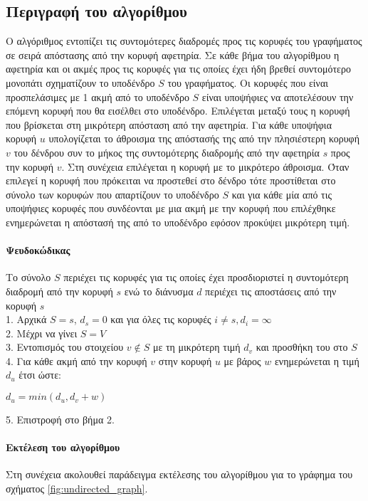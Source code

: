 \subsection{Περιγραφή του αλγορίθμου}
Ο αλγόριθμος εντοπίζει τις συντομότερες διαδρομές προς τις κορυφές του γραφήματος σε σειρά απόστασης από την κορυφή αφετηρία. Σε κάθε βήμα του αλγορίθμου η αφετηρία και οι ακμές προς τις κορυφές για τις οποίες έχει ήδη βρεθεί συντομότερο μονοπάτι σχηματίζουν το υποδένδρο $S$ του γραφήματος. Οι κορυφές που είναι προσπελάσιμες με 1 ακμή από το υποδένδρο $S$ είναι υποψήφιες να αποτελέσουν την επόμενη κορυφή που θα εισέλθει στο υποδένδρο. Επιλέγεται μεταξύ τους η κορυφή που βρίσκεται στη μικρότερη απόσταση από την αφετηρία. Για κάθε υποψήφια κορυφή $u$ υπολογίζεται το άθροισμα της απόστασής της από την πλησιέστερη κορυφή $v$ του δένδρου συν το μήκος της συντομότερης διαδρομής από την αφετηρία $s$ προς την κορυφή $v$. Στη συνέχεια επιλέγεται η κορυφή με το μικρότερο άθροισμα. Όταν επιλεγεί η κορυφή που πρόκειται να προστεθεί στο δένδρο τότε προστίθεται στο σύνολο των κορυφών που απαρτίζουν το υποδένδρο $S$  και για κάθε μία από τις υποψήφιες κορυφές που συνδέονται με μια ακμή με την κορυφή που επιλέχθηκε ενημερώνεται η απόστασή της από το υποδένδρο εφόσον προκύψει μικρότερη τιμή.

\paragraph{Ψευδοκώδικας}
Το σύνολο $S$ περιέχει τις κορυφές για τις οποίες έχει προσδιοριστεί η συντομότερη διαδρομή από την κορυφή $s$ ενώ το διάνυσμα $d$ περιέχει τις αποστάσεις από την κορυφή $s$ \\
1. Αρχικά $S={s}$, $d_s=0$ και για όλες τις κορυφές $i \neq s, d_i=\infty$ \\
2. Μέχρι να γίνει $S=V$ \\
3. Εντοπισμός του στοιχείου $v \notin S$ με τη μικρότερη τιμή $d_v$ και προσθήκη του στο $S$ \\
4. Για κάθε ακμή από την κορυφή $v$ στην κορυφή $u$ με βάρος $w$ ενημερώνεται η τιμή $d_u$ έτσι ώστε: \\
\centerline{$d_u=min(d_u, d_v+w)$}
5. Επιστροφή στο βήμα 2.

\paragraph{Εκτέλεση του αλγορίθμου}
Στη συνέχεια ακολουθεί παράδειγμα εκτέλεσης του αλγορίθμου για το γράφημα του σχήματος \ref{fig:undirected_graph}.

